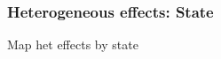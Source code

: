 \documentclass{beamer}
\begin{document}
\begin{frame}
\frametitle{Heterogeneous effects: State}

Map het effects by state

\end{frame}
%
%
%
%
%
%
%
%
%
%
%
%
%
\end{document}
